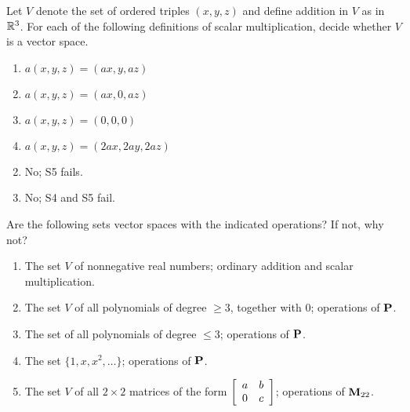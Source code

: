 \begin{multicols}{2}
\begin{ex}
Let $V$ denote the set of ordered triples $(x, y, z)$ and define addition in $V$ as in $\mathbb{R}^3$. For each of the following definitions of scalar multiplication, decide whether $V$ is a vector space.


\begin{enumerate}[label={\alph*.}]
\item $a(x, y, z) = (ax, y, az)$

\item $a(x, y, z) = (ax, 0, az)$

\item $a(x, y, z) = (0, 0, 0)$

\item $a(x, y, z) = (2ax, 2ay, 2az)$

\end{enumerate}
\begin{sol}
\begin{enumerate}[label={\alph*.}]
\setcounter{enumi}{1}
\item  No; S5 fails.

\setcounter{enumi}{3}
\item  No; S4 and S5 fail.

\end{enumerate}
\end{sol}
\end{ex}

\begin{ex}
Are the following sets vector spaces with the indicated operations? If not, why not?

\begin{enumerate}[label={\alph*.}]
\item The set $V$ of nonnegative real numbers; ordinary addition and scalar multiplication.

\item The set $V$ of all polynomials of degree $\geq 3$, \newline together with $0$; operations of $\textbf{P}$.

\item The set of all polynomials of degree $\leq 3$; operations of $\textbf{P}$.

\item The set $\{1, x, x^{2}, \dots\}$; operations of $\textbf{P}$.

\item The set $V$ of all $2 \times 2$ matrices of the form 
$\left[ \begin{array}{cc}
a & b \\
0 & c
\end{array} \right]
$; operations of $\textbf{M}_{22}$.


\end{enumerate}
\end{ex}
\end{multicols}
